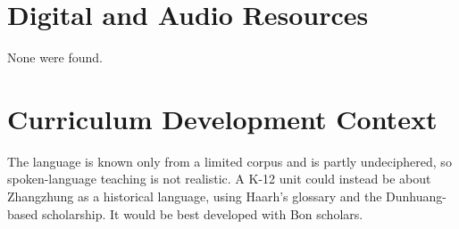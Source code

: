 \documentclass[12pt]{article}
\begin{document}
\section{Digital and Audio Resources}
None were found.

\section{Curriculum Development Context}
The language is known only from a limited corpus and is partly undeciphered, so spoken-language teaching is not realistic. A K-12 unit could instead be about Zhangzhung as a historical language, using Haarh's glossary and the Dunhuang-based scholarship. It would be best developed with Bon scholars.
\end{document}
